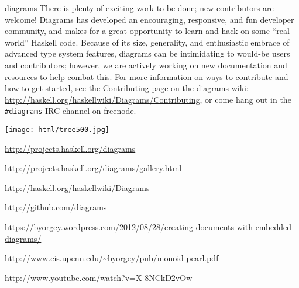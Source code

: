 \begin{hcarentry}[updated]{diagrams}
There is plenty of exciting work to be done; new contributors are
welcome!  Diagrams has developed an encouraging, responsive, and fun
developer community, and makes for a great opportunity to learn and
hack on some ``real-world'' Haskell code.  Because of its size,
generality, and enthusiastic embrace of advanced type system features,
diagrams can be intimidating to would-be users and contributors;
however, we are actively working on new documentation and resources to
help combat this.  For more information on ways to contribute and how
to get started, see the Contributing page on the diagrams wiki:
\url{http://haskell.org/haskellwiki/Diagrams/Contributing}, or come
hang out in the \texttt{\#diagrams} IRC channel on freenode.

\begin{center}
\texttt{[image: html/tree500.jpg]}
\end{center}

\FurtherReading
\begin{compactitem}
\item \url{http://projects.haskell.org/diagrams}
\item \url{http://projects.haskell.org/diagrams/gallery.html}
\item \url{http://haskell.org/haskellwiki/Diagrams}
\item \url{http://github.com/diagrams}
\item \url{https://byorgey.wordpress.com/2012/08/28/creating-documents-with-embedded-diagrams/}
\item \url{http://www.cis.upenn.edu/~byorgey/pub/monoid-pearl.pdf}
\item \url{http://www.youtube.com/watch?v=X-8NCkD2vOw}
\end{compactitem}
\end{hcarentry}

